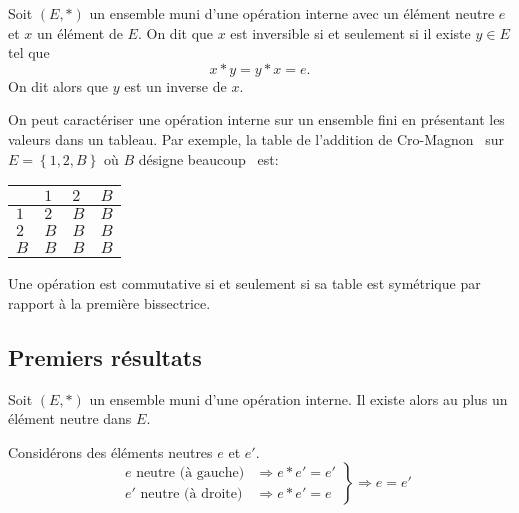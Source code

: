 \begin{defi}
  Soit $(E,*)$ un ensemble muni d'une opération interne avec un élément neutre $e$ et $x$ un élément de $E$.\newline
On dit que $x$ est inversible si et seulement si il existe $y\in E$ tel que
\begin{displaymath}
  x*y = y*x = e .
\end{displaymath}
On dit alors que $y$ est un inverse de $x$.
\end{defi}
On peut caractériser une opération interne sur un ensemble fini en présentant les valeurs dans un tableau. Par exemple, la table de \og l'addition de Cro-Magnon\fg~ sur $E=\left\lbrace 1, 2, B\right\rbrace$ où $B$ désigne \og beaucoup\fg~ est:
\begin{center}
\begin{tabular}{|l|l|l|l|} \hline
    & $1$ & $2$ & $B$\\ \hline
$1$ & $2$ & $B$ & $B$\\ \hline
$2$ & $B$ & $B$ & $B$\\ \hline
$B$ & $B$ & $B$ & $B$ \\ \hline
\end{tabular}
\end{center}
Une opération est commutative si et seulement si sa table est symétrique par rapport à la première bissectrice.

\subsection{Premiers résultats}
\begin{prop}
Soit $(E,*)$ un ensemble muni d'une opération interne. Il existe alors au plus un élément neutre dans $E$.
\end{prop}
\begin{demo}
Considérons des éléments neutres $e$ et $e'$.
\begin{displaymath}
\left. 
\begin{aligned}
&e \text{ neutre (à gauche)} &\Rightarrow e*e' = e'\\
&e' \text{ neutre (à droite)} &\Rightarrow e*e' = e
\end{aligned}
\right\rbrace \Rightarrow e = e'
\end{displaymath}
\end{demo}

